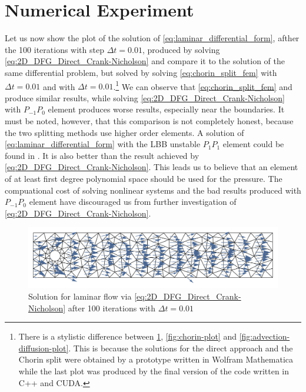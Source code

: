 \section{Numerical Experiment}
Let us now show the plot of the solution of \cref{eq:laminar_differential_form}, afther the 100 iterations with step $\Delta t = 0.01$, produced by solving \cref{eq:2D_DFG_Direct_Crank-Nicholson} and compare it to the solution of the same differential problem, but solved by solving \cref{eq:chorin_split_fem} with $\Delta t = 0.01$ and with $\Delta t = 0.01$.\footnote{There is a stylistic difference between \cref{fig:p0p1-plot}, \cref{fig:chorin-plot} and \cref{fig:advection-diffusion-plot}. This is because the solutions for the direct approach and the Chorin split were obtained by a prototype written in Wolfram Mathematica while the last plot was produced by the final version of the code written in C++ and CUDA.} We can observe that \cref{eq:chorin_split_fem}  and  produce similar results, while solving \cref{eq:2D_DFG_Direct_Crank-Nicholson} with $P_{-1}P_0$ element produces worse results, especially near the boundaries. It must be noted, however, that this comparison is not completely honest, because the two splitting methods use higher order elements. A solution of \cref{eq:laminar_differential_form} with the LBB unstable $P_1P_1$ element could be found in \cite{Larson-Bengzon}. It is also better than the result achieved by \cref{eq:2D_DFG_Direct_Crank-Nicholson}. This leads us to believe that an element of at least first degree polynomial space should be used for the pressure. The compuational cost of solving nonlinear systems and the bad results produced with $P_{-1}P_0$ element have discouraged us from further investigation of \cref{eq:2D_DFG_Direct_Crank-Nicholson}.

\begin{figure}[H]
\centering
\includegraphics[width=\textwidth]{Figures/01_introduction/P1P0_100.pdf}
\caption{Solution for laminar flow via \cref{eq:2D_DFG_Direct_Crank-Nicholson} after 100 iterations with $\Delta t = 0.01$ }\label{fig:p0p1-plot}
\end{figure}

